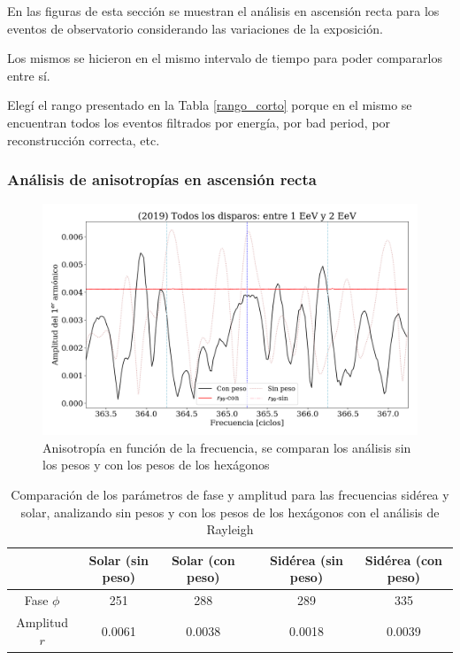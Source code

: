  En las figuras de esta sección se muestran el análisis en ascensión recta para los eventos de observatorio considerando las variaciones de la exposición.

 Los mismos se hicieron en el mismo intervalo de tiempo para poder compararlos entre sí. 
 
 Elegí el rango presentado en la Tabla \ref{rango_corto}  porque en el mismo se encuentran todos los eventos filtrados por energía, por bad period, por reconstrucción correcta, etc.


	\subsubsection{Análisis de anisotropías en ascensión recta}
		
		\begin{figure}[H]
			\centering
			\includegraphics[width=0.75\linewidth]{pesos_sin_con_1_2_EeV.png}
			\caption{Anisotropía en función de la frecuencia, se comparan los análisis sin los pesos y con los pesos de los hexágonos}
		\end{figure}
		
		
		\begin{table}[H]
		\centering
		\begin{tabular}{c|c|c|c|c|c}
					& Solar (sin peso)	& Solar (con peso)	&& Sidérea (sin peso) 	& Sidérea (con peso)	 \\ \hline
		Fase $\phi$ & 251	    		& 288	    		&& 289				& 335				\\
		Amplitud $r$& 0.0061	    	& 0.0038	  		&&0.0018		& 0.0039			\\
		\end{tabular}
		\caption{Comparación de los parámetros de fase y amplitud para las frecuencias sidérea y solar, analizando sin pesos y con los pesos de los hexágonos con el análisis de Rayleigh}
		\end{table}


